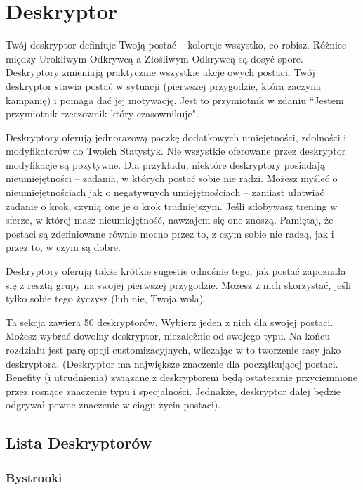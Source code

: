 \section{Deskryptor}

Twój deskryptor definiuje Twoją postać – koloruje wszystko, co robisz. Różnice między Urokliwym Odkrywcą a Złośliwym Odkrywcą są dosyć spore. Deskryptory zmieniają praktycznie wszystkie akcje owych postaci. Twój deskryptor stawia postać w sytuacji (pierwszej przygodzie, która zaczyna kampanię) i pomaga dać jej motywację. Jest to przymiotnik w zdaniu “Jestem przymiotnik rzeczownik który czasownikuje". 

Deskryptory oferują jednorazową paczkę dodatkowych umiejętności, zdolności i modyfikatorów do Twoich Statystyk. Nie wszystkie oferowane przez deskryptor modyfikacje są pozytywne. Dla przykładu, niektóre deskryptory posiadają nieumiejętności – zadania, w których postać sobie nie radzi. Możesz myśleć o nieumiejętnościach jak o negatywnych umiejętnościach – zamiast ułatwiać zadanie o krok, czynią one je o krok trudniejszym. Jeśli zdobywasz trening w sferze, w której masz nieumiejętność, nawzajem się one znoszą. Pamiętaj, że postaci są zdefiniowane równie mocno przez to, z czym sobie nie radzą, jak i przez to, w czym są dobre. 

Deskryptory oferują także krótkie sugestie odnośnie tego, jak postać zapoznała się z resztą grupy na swojej pierwszej przygodzie. Możesz z nich skorzystać, jeśli tylko sobie tego życzysz (lub nie, Twoja wola).

Ta sekcja zawiera 50 deskryptorów. Wybierz jeden z nich dla swojej postaci. Możesz wybrać dowolny deskryptor, niezależnie od swojego typu. Na końcu rozdziału jest parę opcji customizacyjnych, wliczając w to tworzenie rasy jako deskryptora.
(Deskryptor ma największe znaczenie dla początkującej postaci. Benefity (i utrudnienia) związane z deskryptorem będą ostatecznie przyciemnione przez rosnące znaczenie typu i specjalności. Jednakże, deskryptor dalej będzie odgrywał pewne znaczenie w ciągu życia postaci). 

\subsection{Lista Deskryptorów}

\subsubsection{Bystrooki}

